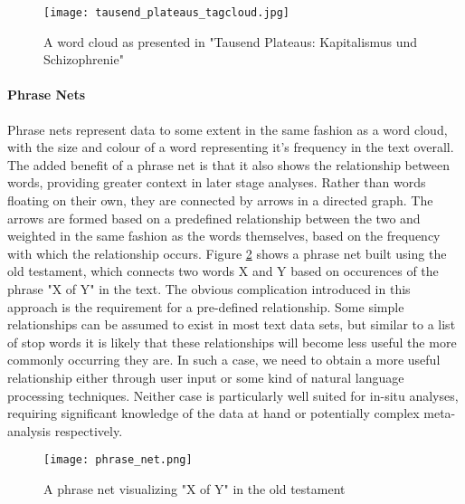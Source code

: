 \begin{figure}
	\centering
	\texttt{[image: tausend\_plateaus\_tagcloud.jpg]}
	\caption{A word cloud as presented in "Tausend Plateaus: Kapitalismus und Schizophrenie" \citep{Deleuze1987}}
	\label{fig:wordcloud}
\end{figure}

\paragraph{Phrase Nets}
Phrase nets \citep{VanHam2009} represent data to some extent in the same fashion as a word cloud, with the size and colour of a word representing it's frequency in the text overall. The added benefit of a phrase net is that it also shows the relationship between words, providing greater context in later stage analyses. Rather than words floating on their own, they are connected by arrows in a directed graph. The arrows are formed based on a predefined relationship between the two and weighted in the same fashion as the words themselves, based on the frequency with which the relationship occurs. Figure \ref{fig:phrasenet} shows a phrase net built using the old testament, which connects two words X and Y based on occurences of the phrase "X of Y" in the text. The obvious complication introduced in this approach is the requirement for a pre-defined relationship. Some simple relationships can be assumed to exist in most text data sets, but similar to a list of stop words it is likely that these relationships will become less useful the more commonly occurring they are. In such a case, we need to obtain a more useful relationship either through user input or some kind of natural language processing techniques. Neither case is particularly well suited for in-situ analyses, requiring significant knowledge of the data at hand or potentially complex meta-analysis respectively. 

\begin{figure}
	\centering
	\texttt{[image: phrase\_net.png]}
	\caption{A phrase net visualizing "X of Y" in the old testament \citep{VanHam2009}}
	\label{fig:phrasenet}
\end{figure}

